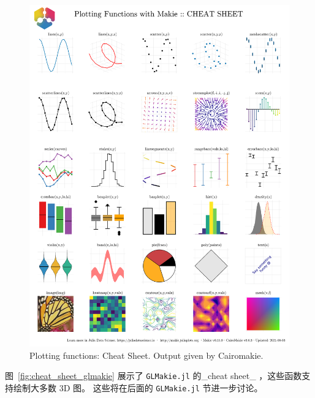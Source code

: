 \documentclass[
  notoc %
]{tufte-book}
\newcommand{\passthrough}[1]{#1}
\begin{document}
\begin{figure}
\hypertarget{fig:cheat_sheet_cairomakie}{%
\centering
\includegraphics{images/makiePlottingFunctionsHide.png}
\caption{Plotting functions: Cheat Sheet. Output given by
Cairomakie.}\label{fig:cheat_sheet_cairomakie}
}
\end{figure}

图~\ref{fig:cheat_sheet_glmakie} 展示了
\passthrough{\lstinline!GLMakie.jl!} 的\_cheat sheet\_
，这些函数支持绘制大多数 3D 图。 这些将在后面的
\passthrough{\lstinline!GLMakie.jl!} 节进一步讨论。
\end{document}

